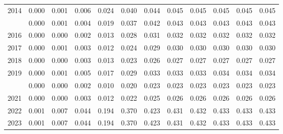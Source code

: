 \documentclass[
]{article}
\begin{document}
\begin{longtable}[t]{lrrrrrrrrrrr}
2014 & 0.000 & 0.001 & 0.006 & 0.024 & 0.040 & 0.044 & 0.045 & 0.045 & 0.045 & 0.045 & 0.045\\
\addlinespace
2015 & 0.000 & 0.001 & 0.004 & 0.019 & 0.037 & 0.042 & 0.043 & 0.043 & 0.043 & 0.043 & 0.043\\
2016 & 0.000 & 0.000 & 0.002 & 0.013 & 0.028 & 0.031 & 0.032 & 0.032 & 0.032 & 0.032 & 0.032\\
2017 & 0.000 & 0.001 & 0.003 & 0.012 & 0.024 & 0.029 & 0.030 & 0.030 & 0.030 & 0.030 & 0.030\\
2018 & 0.000 & 0.000 & 0.003 & 0.013 & 0.023 & 0.026 & 0.027 & 0.027 & 0.027 & 0.027 & 0.027\\
2019 & 0.000 & 0.001 & 0.005 & 0.017 & 0.029 & 0.033 & 0.033 & 0.033 & 0.034 & 0.034 & 0.034\\
\addlinespace
2020 & 0.000 & 0.000 & 0.002 & 0.010 & 0.020 & 0.023 & 0.023 & 0.023 & 0.023 & 0.023 & 0.023\\
2021 & 0.000 & 0.000 & 0.003 & 0.012 & 0.022 & 0.025 & 0.026 & 0.026 & 0.026 & 0.026 & 0.026\\
2022 & 0.001 & 0.007 & 0.044 & 0.194 & 0.370 & 0.423 & 0.431 & 0.432 & 0.433 & 0.433 & 0.433\\
2023 & 0.001 & 0.007 & 0.044 & 0.194 & 0.370 & 0.423 & 0.431 & 0.432 & 0.433 & 0.433 & 0.433\\*
\end{longtable}
\end{document}
